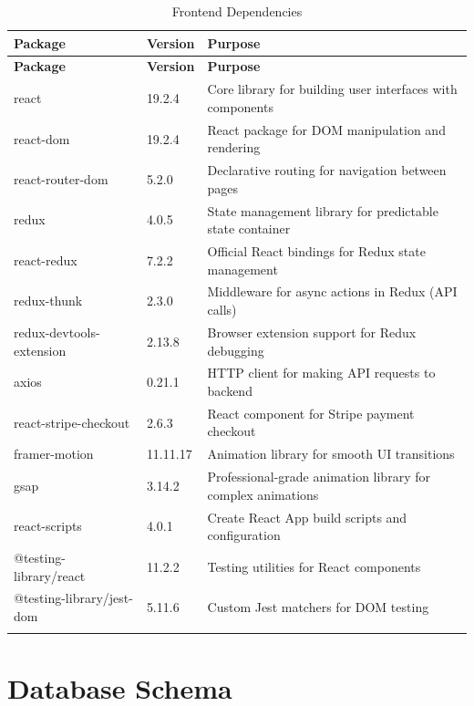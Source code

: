 \documentclass[12pt,a4paper]{article}
\begin{document}
\begin{longtable}{@{}p{4cm}p{1.5cm}p{7.5cm}@{}}
\toprule
\textbf{Package} & \textbf{Version} & \textbf{Purpose} \\
\midrule
\endfirsthead
\toprule
\textbf{Package} & \textbf{Version} & \textbf{Purpose} \\
\midrule
\endhead
react & 19.2.4 & Core library for building user interfaces with components \\
\midrule
react-dom & 19.2.4 & React package for DOM manipulation and rendering \\
\midrule
react-router-dom & 5.2.0 & Declarative routing for navigation between pages \\
\midrule
redux & 4.0.5 & State management library for predictable state container \\
\midrule
react-redux & 7.2.2 & Official React bindings for Redux state management \\
\midrule
redux-thunk & 2.3.0 & Middleware for async actions in Redux (API calls) \\
\midrule
redux-devtools-extension & 2.13.8 & Browser extension support for Redux debugging \\
\midrule
axios & 0.21.1 & HTTP client for making API requests to backend \\
\midrule
react-stripe-checkout & 2.6.3 & React component for Stripe payment checkout \\
\midrule
framer-motion & 11.11.17 & Animation library for smooth UI transitions \\
\midrule
gsap & 3.14.2 & Professional-grade animation library for complex animations \\
\midrule
react-scripts & 4.0.1 & Create React App build scripts and configuration \\
\midrule
@testing-library/react & 11.2.2 & Testing utilities for React components \\
\midrule
@testing-library/jest-dom & 5.11.6 & Custom Jest matchers for DOM testing \\
\bottomrule
\caption{Frontend Dependencies}
\end{longtable}

\newpage
\section{Database Schema}
\end{document}
